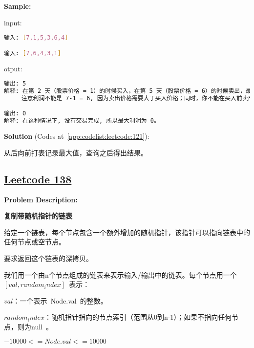 \textbf{Sample:}\par

input:\par

\begin{lstlisting}[language=bash]
输入: [7,1,5,3,6,4]

输入: [7,6,4,3,1]
\end{lstlisting}

otput:\par

\begin{lstlisting}[language=bash]
输出: 5
解释: 在第 2 天（股票价格 = 1）的时候买入，在第 5 天（股票价格 = 6）的时候卖出，最大利润 = 6-1 = 5 。
     注意利润不能是 7-1 = 6, 因为卖出价格需要大于买入价格；同时，你不能在买入前卖出股票。

输出: 0
解释: 在这种情况下, 没有交易完成, 所以最大利润为 0。
\end{lstlisting}

\textbf{Solution }(Codes at~\ref{app:codelist:leetcode:121}):\par

从后向前打表记录最大值，查询之后得出结果。\par



\subsection{\href{https://leetcode-cn.com/}{Leetcode 138}}\label{app:problemlist:leetcode:138}

\textbf{Problem Description:}\par

\textbf{复制带随机指针的链表}\par

给定一个链表，每个节点包含一个额外增加的随机指针，该指针可以指向链表中的任何节点或空节点。\par

要求返回这个链表的深拷贝。 \par

我们用一个由n个节点组成的链表来表示输入/输出中的链表。每个节点用一个 $ [val, random_index] $ 表示：\par

$ val $：一个表示 Node.val 的整数。\par
$ random_index $：随机指针指向的节点索引（范围从0到n-1）；如果不指向任何节点，则为null 。\par

$ -10000 <= Node.val <= 10000 $\par

